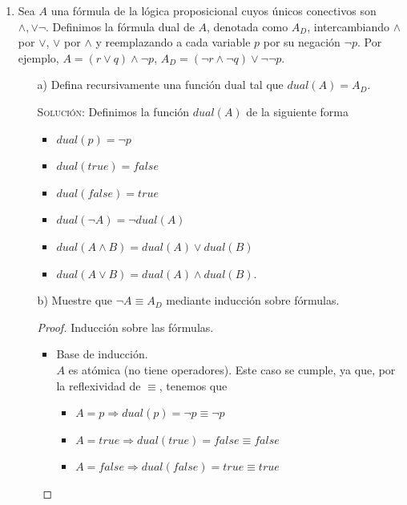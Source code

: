 \documentclass[letterpaper,11pt]{article}
\begin{document}
\begin{enumerate}
    \item Sea $A$ una fórmula de la lógica proposicional cuyos únicos 
    conectivos son $\land, \lor \neg$. Definimos la fórmula dual de $A$, 
    denotada como $A_{D}$, intercambiando $\land$ por $\lor$, $\lor$ por 
    $\land$ y reemplazando a cada variable $p$ por su negación $\neg p$.
    Por ejemplo, $A = (r \lor q) \land \neg p$, $A_{D} = (\neg r \land \neg q)
    \lor \neg \neg p$.
    \begin{itemize}
        \item[a)] Defina recursivamente una función dual tal que 
        $dual(A) = A_{D}$.

        \textsc{Solución:} Definimos la función $dual(A)$ de la siguiente forma 
        \begin{itemize}
            \item $dual(p) = \neg p$
            \item $dual(true) = false$
            \item $dual(false) = true$
            \item $dual(¬A) = ¬dual(A)$
            \item $dual(A \land B) = dual(A) \lor dual(B)$
            \item $dual(A \lor B) = dual(A) \land dual(B)$. 
        \end{itemize}

        \item[b)] Muestre que $¬A ≡ A_{D}$ mediante inducción sobre 
        fórmulas.

        \begin{proof}
            Inducción sobre las fórmulas.

            \begin{itemize}
                \item Base de inducción. \\ 
                $A$ es atómica (no tiene operadores). Este caso se cumple, ya 
                que, por la reflexividad de $≡$, tenemos que 
                \begin{itemize}
                    \item $A = p ⇒ dual(p) = ¬p ≡ ¬p$
                    \item $A = true ⇒ dual(true) = false ≡ false$
                    \item $A = false ⇒ dual(false) = true ≡ true$
                \end{itemize}


\end{itemize}
\end{proof}
\end{itemize}
\end{enumerate}
\end{document}
